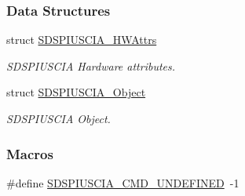 \subsubsection*{Data Structures}
\begin{DoxyCompactItemize}
\item 
struct \hyperlink{struct_s_d_s_p_i_u_s_c_i_a___h_w_attrs}{S\-D\-S\-P\-I\-U\-S\-C\-I\-A\-\_\-\-H\-W\-Attrs}
\begin{DoxyCompactList}\small\item\em S\-D\-S\-P\-I\-U\-S\-C\-I\-A Hardware attributes. \end{DoxyCompactList}\item 
struct \hyperlink{struct_s_d_s_p_i_u_s_c_i_a___object}{S\-D\-S\-P\-I\-U\-S\-C\-I\-A\-\_\-\-Object}
\begin{DoxyCompactList}\small\item\em S\-D\-S\-P\-I\-U\-S\-C\-I\-A Object. \end{DoxyCompactList}\end{DoxyCompactItemize}
\subsubsection*{Macros}
\begin{DoxyCompactItemize}
\item 
\#define \hyperlink{_s_d_s_p_i_u_s_c_i_a_8h_a850de11c825eb4968bb3520f78e063c1}{S\-D\-S\-P\-I\-U\-S\-C\-I\-A\-\_\-\-C\-M\-D\-\_\-\-U\-N\-D\-E\-F\-I\-N\-E\-D}~-\/1
\end{DoxyCompactItemize}

